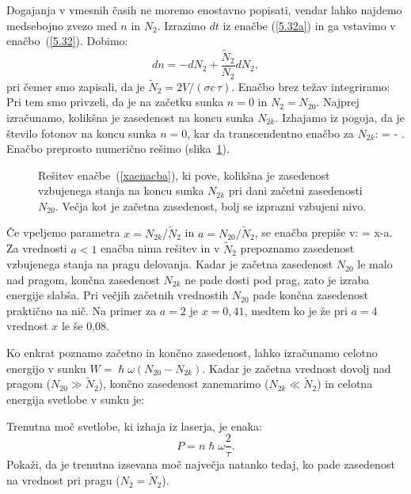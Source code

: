 Dogajanja v vmesnih časih ne moremo enostavno popisati, vendar lahko najdemo
medsebojno zvezo med $n$ in $N_2$. 
Izrazimo $dt$ iz enačbe (\ref{5.32a}) in ga vstavimo v enačbo~(\ref{5.32}).
Dobimo:
\begin{equation}
dn=-dN_{2}+\frac{\tilde{N}_2}{N_{2}}dN_{2},\label{5.341}
\end{equation}
pri čemer smo zapisali, da je $\tilde{N}_{2}=2V/(\sigma c\,\tau)$.
Enačbo brez težav integriramo:
Pri tem smo privzeli, da je na začetku sunka $n=0$ in $N_{2}=N_{20}$. 
Najprej izračunamo, kolikšna je zasedenost na koncu sunka 
$N_{2k}$. Izhajamo iz pogoja, da je število fotonov na koncu sunka $n=0$, 
kar da transcendentno enačbo za $N_{2k}$:
\beq
\ln {} = - .
\label{xaenacba}
\eeq
Enačbo preprosto numerično rešimo (slika~\ref{fig:Qeq}).

\begin{figure}[ht]
\centering
\def\svgwidth{90truemm} 

\caption{Rešitev enačbe~(\ref{xaenacba}), ki pove, kolikšna je
zasedenost vzbujenega stanja na koncu sunka $N_{2k}$ pri dani začetni 
zasedenosti $N_{20}$. Večja kot je začetna zasedenost, bolj se 
izprazni vzbujeni nivo.
}
\label{fig:Qeq}
\end{figure}

Če vpeljemo parametra $x=N_{2k}/\tilde{N}_2$ in $a=N_{20}/\tilde{N}_{2}$, se
enačba prepiše v:
\beq
\ln {}= x-a.
\eeq
Za vrednosti $a<1$ enačba nima rešitev in 
v $\tilde{N}_{2}$ prepoznamo zasedenost vzbujenega stanja na pragu delovanja. Kadar je začetna 
zasedenost $N_{20}$ le malo nad pragom, končna zasedenost $N_{2k}$ ne pade 
dosti pod prag, zato je izraba energije slabša. Pri večjih začetnih vrednostih 
$N_{20}$ pade končna zasedenost praktično na nič. Na primer za $a=2$
je $x=0,41$, medtem ko je že pri $a=4$ vrednost $x$ le še 0,08. 

Ko enkrat poznamo začetno in končno zasedenost, lahko izračunamo 
celotno energijo v sunku $W=\hslash \omega (N_{20}-N_{2k})$. Kadar je začetna vrednost
dovolj nad pragom ($N_{20}\gg\tilde{N}_{2}$), končno zasedenost zanemarimo ($N_{2k}\ll\tilde{N}_{2}$) in 
celotna energija svetlobe v sunku je:
\begin{naloga}
\label{nalpmax}
Trenutna moč svetlobe, ki izhaja iz laserja, je enaka:
\begin{equation}
P=n \hslash \omega \frac{2}{\tau}.
\end{equation}
Pokaži, da je trenutna izsevana moč največja natanko tedaj, ko pade zasedenost na vrednost pri 
pragu ($N_{2}=\tilde{N}_{2}$). 
\end{naloga}

